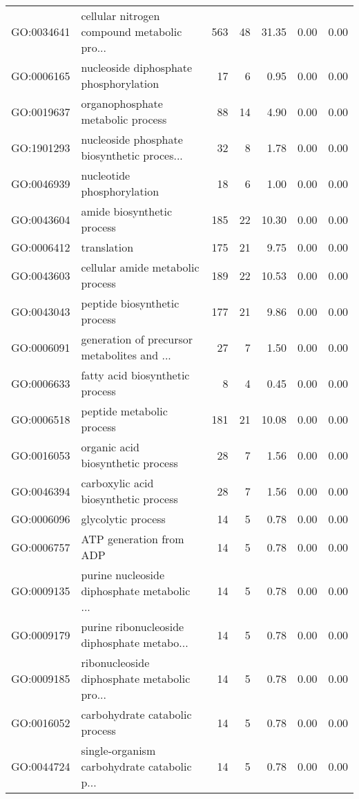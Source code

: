 \begin{table}[ht]
\begin{tabular}{llrrrrr}
  GO:0034641 & cellular nitrogen compound metabolic pro... & 563 &  48 & 31.35 & 0.00 & 0.00 \\ 
  GO:0006165 & nucleoside diphosphate phosphorylation &  17 &   6 & 0.95 & 0.00 & 0.00 \\ 
  GO:0019637 & organophosphate metabolic process &  88 &  14 & 4.90 & 0.00 & 0.00 \\ 
  GO:1901293 & nucleoside phosphate biosynthetic proces... &  32 &   8 & 1.78 & 0.00 & 0.00 \\ 
  GO:0046939 & nucleotide phosphorylation &  18 &   6 & 1.00 & 0.00 & 0.00 \\ 
  GO:0043604 & amide biosynthetic process & 185 &  22 & 10.30 & 0.00 & 0.00 \\ 
  GO:0006412 & translation & 175 &  21 & 9.75 & 0.00 & 0.00 \\ 
  GO:0043603 & cellular amide metabolic process & 189 &  22 & 10.53 & 0.00 & 0.00 \\ 
  GO:0043043 & peptide biosynthetic process & 177 &  21 & 9.86 & 0.00 & 0.00 \\ 
  GO:0006091 & generation of precursor metabolites and ... &  27 &   7 & 1.50 & 0.00 & 0.00 \\ 
  GO:0006633 & fatty acid biosynthetic process &   8 &   4 & 0.45 & 0.00 & 0.00 \\ 
  GO:0006518 & peptide metabolic process & 181 &  21 & 10.08 & 0.00 & 0.00 \\ 
  GO:0016053 & organic acid biosynthetic process &  28 &   7 & 1.56 & 0.00 & 0.00 \\ 
  GO:0046394 & carboxylic acid biosynthetic process &  28 &   7 & 1.56 & 0.00 & 0.00 \\ 
  GO:0006096 & glycolytic process &  14 &   5 & 0.78 & 0.00 & 0.00 \\ 
  GO:0006757 & ATP generation from ADP &  14 &   5 & 0.78 & 0.00 & 0.00 \\ 
  GO:0009135 & purine nucleoside diphosphate metabolic ... &  14 &   5 & 0.78 & 0.00 & 0.00 \\ 
  GO:0009179 & purine ribonucleoside diphosphate metabo... &  14 &   5 & 0.78 & 0.00 & 0.00 \\ 
  GO:0009185 & ribonucleoside diphosphate metabolic pro... &  14 &   5 & 0.78 & 0.00 & 0.00 \\ 
  GO:0016052 & carbohydrate catabolic process &  14 &   5 & 0.78 & 0.00 & 0.00 \\ 
  GO:0044724 & single-organism carbohydrate catabolic p... &  14 &   5 & 0.78 & 0.00 & 0.00 \\ 

\end{tabular}
\end{table}
